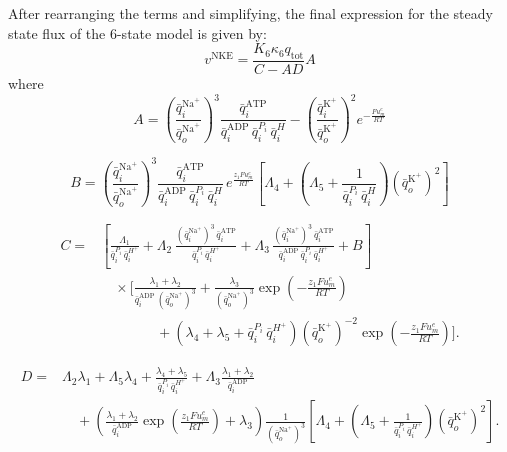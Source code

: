 After rearranging the terms and simplifying, the final expression for the steady state flux of the 6-state model is given by:
\begin{equation}
\label{eq:flux_6state} 
  v^{\mathrm{NKE}} =
\frac{K_6 \kappa_6 q_{\mathrm{tot}}}{C - AD}A
\end{equation}
where
\begin{equation}
A =
\left(
\frac{\bar{q}_i^{\mathrm{Na}^+}}{\bar{q}_o^{\mathrm{Na}^+}}
\right)^3
\frac{\bar{q}_i^{\mathrm{ATP}}}
{\bar{q}_i^{\mathrm{ADP}} \, \bar{q}_i^{P_i} \, \bar{q}_i^{H}}
-
\left(
\frac{\bar{q}_i^{\mathrm{K}^+}}{\bar{q}_o^{\mathrm{K}^+}}
\right)^2
e^{-\frac{F u_m^e}{R T}}
\end{equation}

\begin{equation}
 B =
\left(
\frac{\bar{q}_i^{\mathrm{Na}^+}}{\bar{q}_o^{\mathrm{Na}^+}}
\right)^3
\frac{\bar{q}_i^{\mathrm{ATP}}}
{\bar{q}_i^{\mathrm{ADP}} \, \bar{q}_i^{P_i} \, \bar{q}_i^{H}}
\, e^{\frac{z_1 F u_m^e}{R T}}
\left[
\Lambda_4 +
\left(
\Lambda_5 +
\frac{1}{\bar{q}_i^{P_i} \, \bar{q}_i^{H}}
\right)
\left(
\bar{q}_o^{\mathrm{K}^+}
\right)^2
\right]
\end{equation}

\begin{equation}
\begin{aligned}
C ={}&
\left[ \frac{\Lambda_1}{\bar{q}_i^{P_i} \, \bar{q}_i^{H^+}}
+ \Lambda_2 \,
\frac{\left(\bar{q}_i^{\mathrm{Na}^+}\right)^3 \, \bar{q}_i^{\mathrm{ATP}}}
     {\bar{q}_i^{P_i} \, \bar{q}_i^{H^+}}
+ \Lambda_3 \,
\frac{\left(\bar{q}_i^{\mathrm{Na}^+}\right)^3 \, \bar{q}_i^{\mathrm{ATP}}}
     {\bar{q}_i^{\mathrm{ADP}} \, \bar{q}_i^{P_i} \, \bar{q}_i^{H^+}}
+ B \right]\\
&\quad \times \Bigg[
\frac{\lambda_1 + \lambda_2}
     {\bar{q}_i^{\mathrm{ADP}} \, \left(\bar{q}_o^{\mathrm{Na}^+}\right)^3}
+ \frac{\lambda_3}
       {\left(\bar{q}_o^{\mathrm{Na}^+}\right)^3}
  \exp\!\left(-\frac{z_1 F u_m^{e}}{R T}\right) \\
&\qquad\qquad
+ \left(\lambda_4 + \lambda_5
       + \bar{q}_i^{P_i} \, \bar{q}_i^{H^+}\right)
  \left(\bar{q}_o^{\mathrm{K}^+}\right)^{-2}
  \exp\!\left(-\frac{z_1 F u_m^{e}}{R T}\right)
\Bigg].
\end{aligned}
\end{equation}

\begin{equation}
\begin{aligned}
D ={}& \Lambda_2 \lambda_1
      + \Lambda_5 \lambda_4
      + \frac{\lambda_4 + \lambda_5}{\bar{q}_i^{P_i} \, \bar{q}_i^{H^+}}
      + \Lambda_3 \frac{\lambda_1 + \lambda_2}{\bar{q}_i^{\mathrm{ADP}}} \\
&\quad + \left(
      \frac{\lambda_1 + \lambda_2}{\bar{q}_i^{\mathrm{ADP}}}
      \exp\!\left(\frac{z_1 F u_m^{e}}{R T}\right)
      + \lambda_3
      \right)
      \frac{1}{\left(\bar{q}_o^{\mathrm{Na}^+}\right)^3}
      \left[
      \Lambda_4
      + \left(
        \Lambda_5
        + \frac{1}{\bar{q}_i^{P_i} \, \bar{q}_i^{H^+}}
        \right)
        \left(\bar{q}_o^{\mathrm{K}^+}\right)^2
      \right].
\end{aligned}
\end{equation}

